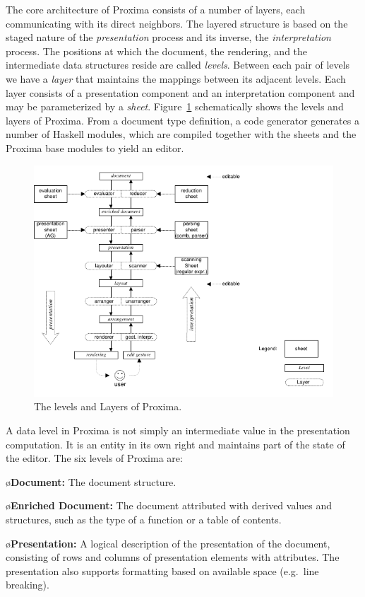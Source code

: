\documentclass[10pt]{article}
\begin{document}
The core architecture of Proxima consists of a number of layers, each communicating with its direct neighbors. The layered structure is based on the staged nature of the {\em presentation} process and its inverse, the {\em interpretation} process. The positions at which the document, the rendering, and the intermediate data structures reside are called {\em levels}. Between each pair of levels we have a {\em layer} that maintains the mappings between its adjacent levels. Each layer consists of a presentation component and an interpretation component and may be parameterized by a {\em sheet}. Figure~\ref{fig:levelsAndLayers} schematically shows the levels and layers of Proxima. From a document type definition, a code generator generates a number of Haskell modules, which are compiled together with the sheets and the Proxima base modules to yield an editor. 

\begin{figure}
\includegraphics[width=12cm]{images/LayerOverview}
\caption{The levels and Layers of Proxima.}
\label{fig:levelsAndLayers}
\end{figure}

A data level in Proxima is not simply an intermediate value in the presentation computation. It is an entity in its own right and maintains part of the state of the editor. The six levels of Proxima are:


\bl
\o {\bf Document:} The document structure.

\o {\bf Enriched Document:} The document attributed with derived values and structures, such as the type of a function or a table of contents.

\o{\bf Presentation:} A logical description of the presentation of the document, consisting of rows and columns of presentation elements with attributes. The presentation also supports formatting based on available space (e.g.\ line breaking).
\end{document}
